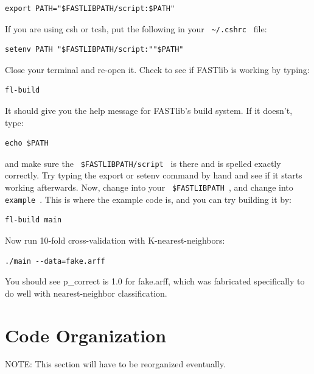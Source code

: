 \documentclass[letter]{report}
\begin{document}
\begin{verbatim}
export PATH="$FASTLIBPATH/script:$PATH"
\end{verbatim}
If you are using csh or tcsh, put the following in your \verb= ~/.cshrc = file: 
\begin{verbatim}
setenv PATH "$FASTLIBPATH/script:""$PATH"
\end{verbatim}
Close your terminal and re-open it. Check to see if FASTlib is working by typing: 
\begin{verbatim}
fl-build 
\end{verbatim}
It should give you the help message for FASTlib's build system. If it doesn't, type:
\begin{verbatim}
echo $PATH
\end{verbatim}
and make sure the \verb= $FASTLIBPATH/script = is there and is spelled exactly correctly. Try typing the export or setenv command by hand and see if it starts working afterwards. Now, change into your \verb= $FASTLIBPATH =, and change into \verb= example =. This is where the example code is, and you can try building it by:
\begin{verbatim}
fl-build main
\end{verbatim}
Now run 10-fold cross-validation with K-nearest-neighbors:
\begin{verbatim}
./main --data=fake.arff
\end{verbatim}
You should see p\_correct is 1.0 for fake.arff, which was fabricated specifically to do well with nearest-neighbor classification. 

\section {Code Organization}
NOTE: This section will have to be reorganized eventually.
\end{document}
